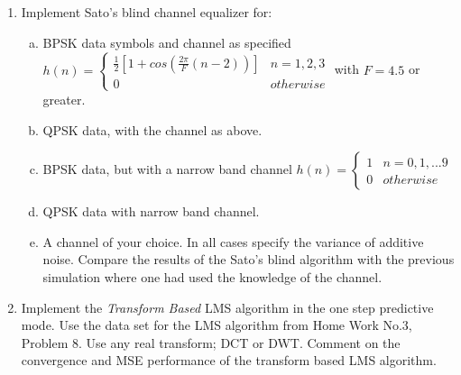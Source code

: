 \documentclass[journal,12pt,twocolumn]{IEEEtran}
\begin{document}
\section{}
\begin{enumerate}
\item Implement Sato's blind channel equalizer for:
%
\begin{enumerate}[(a)]
\item BPSK data symbols and channel as specified
%
$h(n)=\begin{cases}
%
\frac{1}{2}[1+cos(\frac{2\pi}{F}{(n-2)})]& n=1,2,3\\
0 & otherwise
\end{cases}$
with $F=4.5$ or greater.
\item QPSK data, with the channel as above.
\item BPSK data, but with a narrow band channel
$h(n)=\begin{cases}
%
{1}&  n=0,1,... 9\\
0&  otherwise
\end{cases}$
%
\item QPSK data with narrow band channel.
\item A channel of your choice.
In all cases specify the variance of additive noise.
%
Compare the results of the Sato's blind algorithm with the previous simulation where one had used the knowledge
of the channel.
\end{enumerate}
%
\item Implement the \textit{Transform Based} LMS algorithm in the one step predictive mode. Use the data set for the LMS
algorithm from Home Work No.3, Problem 8. Use any real transform; DCT or DWT. Comment on the convergence
and MSE performance of the transform based LMS algorithm.
\end{enumerate}
%
\end{document}

